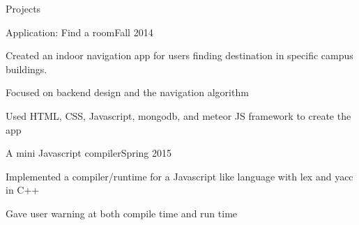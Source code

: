 \documentclass{resume} %
\begin{document}
\begin{rSection}{Projects}

\begin{rSubsection}{Application: Find a room}{Fall 2014}{}{}
\item Created an indoor navigation app for users finding destination in specific campus buildings.
\item Focused on backend design and the navigation algorithm
\item Used HTML, CSS, Javascript, mongodb, and meteor JS framework to create the app
\end{rSubsection}

\begin{rSubsection}{A mini Javascript compiler}{Spring 2015}{}{}
\item Implemented a compiler/runtime for a Javascript like language with lex and yacc in C++
\item Gave user warning at both compile time and run time
\end{rSubsection}










\end{rSection}
\end{document}
